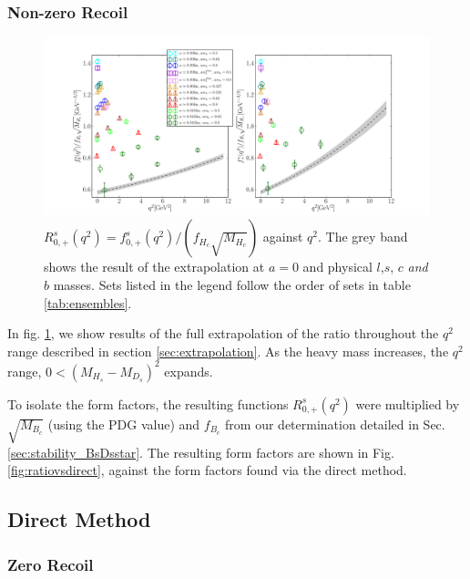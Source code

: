 \subsubsection{Non-zero Recoil}

\begin{figure}[htb!]
  \hspace{-85pt}
  \includegraphics[width=1.40\textwidth]{images/BsDs/ratio/f0fpfHc_vsq2.pdf}
  \caption{ $R_{0,+}^s(q^2) = f_{0,+}^s(q^2)/(f_{H_c}\sqrt{M_{H_c}})$ against $q^2$. The grey band shows the result of the extrapolation at $a=0$ and physical $l$,$s$, $c$ {\it{and}} $b$ masses. Sets listed in the legend follow the order of sets in table \ref{tab:ensembles}. \label{fig:ratiodata}}
\end{figure}

In fig. \ref{fig:ratiodata}, we show results of the full extrapolation of the ratio throughout the $q^2$ range described in section \ref{sec:extrapolation}. As the heavy mass increases, the $q^2$ range, $0 < (M_{H_s}-M_{D_s})^2$ expands.

To isolate the form factors, the resulting functions $R_{0,+}^s(q^2)$ were multiplied by $\sqrt{M_{B_c}}$ (using the PDG value) and $f_{B_c}$ from our determination detailed in Sec. \ref{sec:stability_BsDsstar}. The resulting form factors are shown in Fig. \ref{fig:ratiovsdirect}, against the form factors found via the direct method.

\subsection{Direct Method}

\subsubsection{Zero Recoil}
\label{sec:directq2max}

